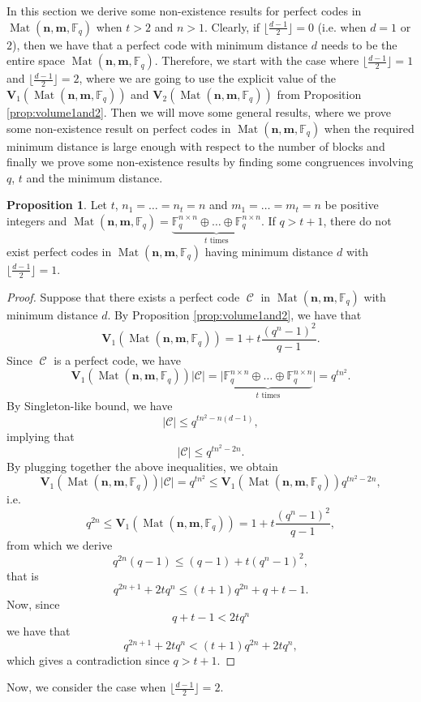 \documentclass[11pt]{amsart}
\DeclareMathOperator{\C}{\mathcal{C}}
\DeclareMathOperator{\Mat}{Mat}
\theoremstyle{definition}
\newtheorem{proposition}[theorem]{Proposition}
\newcommand{\F}{{\mathbb F}}
\newcommand{\bfn}{\mathbf {n}}
\newcommand{\bfm}{\mathbf {m}}
\newcommand{\spacmn}{\Mat(\bfn,\bfm,\F_q)}
\begin{document}
In this section we derive some non-existence results for perfect codes in $\spacmn$ when $t>2$ and $n>1$.
Clearly, if $\lfloor \frac{d-1}2\rfloor=0$ (i.e. when $d=1$ or $2$), then we have that a perfect code with minimum distance $d$ needs to be the entire space $\spacmn$. Therefore, we start with the case where $\lfloor \frac{d-1}2\rfloor=1$ and $\lfloor \frac{d-1}2\rfloor=2$, where we are going to use the explicit value of the $\mathbf{V}_1(\spacmn)$ and $\mathbf{V}_2(\spacmn)$ from Proposition \ref{prop:volume1and2}.
Then we will move some general results, where we prove some non-existence result on perfect codes in $\spacmn$ when the required minimum distance is large enough with respect to the number of blocks and finally we prove some non-existence results by finding some congruences involving $q$, $t$ and the minimum distance.

\begin{proposition}\label{prop:d-1/2=1}
Let $t$, $ n_1 = \ldots = n_t = n $ and $ m_1 = \ldots = m_t = n $ be positive integers and $\spacmn=\underbrace{\mathbb{F}_q^{n\times n}\oplus \ldots \oplus \F_q^{n\times n}}_{t \text{ times}}$.
If $q> t+1$, there do not exist perfect codes in $\spacmn$ having minimum distance $d$ with $\lfloor \frac{d-1}2\rfloor=1$.
\end{proposition}
\begin{proof}
Suppose that there exists a perfect code $\C$ in $\spacmn$ with minimum distance $d$.
By Proposition \ref{prop:volume1and2}, we have that
\[
\mathbf{V}_1(\spacmn)=1+t\frac{(q^n-1)^2}{q-1}.
\]
Since $\C$ is a perfect code, we have
\[
\mathbf{V}_1(\spacmn)\lvert \mathcal{C}\rvert=\lvert\underbrace{\mathbb{F}_q^{n\times n}\oplus \ldots \oplus \F_q^{n\times n}}_{t \text{ times}}\rvert=q^{tn^2}.
\]
By Singleton-like bound, we have
\[
\lvert \mathcal{C}\rvert\leq q^{tn^2-n(d-1)},
\]
implying that 
\[
\lvert \mathcal{C}\rvert\leq q^{tn^2-2n}.
\]
By plugging together the above inequalities, we obtain
\[
\mathbf{V}_1(\spacmn)\lvert\mathcal{C}\rvert=q^{tn^2}\leq \mathbf{V}_1(\spacmn)q^{tn^2-2n},
\]
i.e.
\[
q^{2n}\leq \mathbf{V}_1(\spacmn)=1+t\frac{(q^n-1)^2}{q-1},
\]
from which we derive
\[
q^{2n}(q-1)\leq (q-1)+t(q^n-1)^2,
\]
that is
\[
q^{2n+1}+2tq^n \leq (t+1)q^{2n}+q+t-1.
\]
Now, since
\[
q+t-1<2tq^n
\]
we have that 
\[
q^{2n+1}+2tq^n < (t+1)q^{2n}+2tq^n,
\]
which gives a contradiction since $q>t+1$.
\end{proof}

Now, we consider the case when $\lfloor \frac{d-1}2\rfloor=2$.
\end{document}
